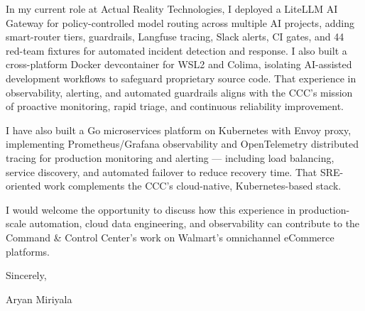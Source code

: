 \documentclass[letterpaper,11pt]{article}
\begin{document}
In my current role at Actual Reality Technologies, I deployed a LiteLLM AI Gateway for policy-controlled model routing across multiple AI projects, adding smart-router tiers, guardrails, Langfuse tracing, Slack alerts, CI gates, and 44 red-team fixtures for automated incident detection and response. I also built a cross-platform Docker devcontainer for WSL2 and Colima, isolating AI-assisted development workflows to safeguard proprietary source code. That experience in observability, alerting, and automated guardrails aligns with the CCC's mission of proactive monitoring, rapid triage, and continuous reliability improvement.

\vspace{6pt}

I have also built a Go microservices platform on Kubernetes with Envoy proxy, implementing Prometheus/Grafana observability and OpenTelemetry distributed tracing for production monitoring and alerting — including load balancing, service discovery, and automated failover to reduce recovery time. That SRE-oriented work complements the CCC's cloud-native, Kubernetes-based stack.

\vspace{6pt}

I would welcome the opportunity to discuss how this experience in production-scale automation, cloud data engineering, and observability can contribute to the Command \& Control Center's work on Walmart's omnichannel eCommerce platforms.

\vspace{12pt}

Sincerely,

\vspace{12pt}

Aryan Miriyala
\end{document}
